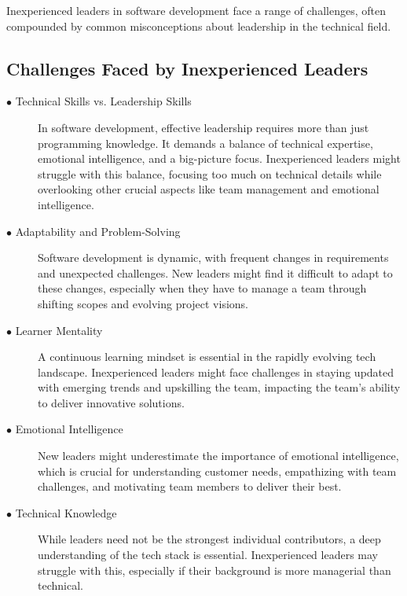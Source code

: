 \documentclass[runningheads]{llncs}
\begin{document}
 Inexperienced leaders in software development face a range of challenges, often compounded by common misconceptions about leadership in the technical field.

\subsection{Challenges Faced by Inexperienced Leaders}

\begin{description}
  \item [$\bullet$ Technical Skills vs. Leadership Skills] In software development, effective leadership requires more than just programming knowledge. It demands a balance of technical expertise, emotional intelligence, and a big-picture focus. Inexperienced leaders might struggle with this balance, focusing too much on technical details while overlooking other crucial aspects like team management and emotional intelligence.
  \\
  
  \item [$\bullet$ Adaptability and Problem-Solving] Software development is dynamic, with frequent changes in requirements and unexpected challenges. New leaders might find it difficult to adapt to these changes, especially when they have to manage a team through shifting scopes and evolving project visions.
  \\

  \item [$\bullet$ Learner Mentality] A continuous learning mindset is essential in the rapidly evolving tech landscape. Inexperienced leaders might face challenges in staying updated with emerging trends and upskilling the team, impacting the team's ability to deliver innovative solutions.
  \\
  
  \item [$\bullet$ Emotional Intelligence] New leaders might underestimate the importance of emotional intelligence, which is crucial for understanding customer needs, empathizing with team challenges, and motivating team members to deliver their best.
  \\
  
  \item [$\bullet$ Technical Knowledge] While leaders need not be the strongest individual contributors, a deep understanding of the tech stack is essential. Inexperienced leaders may struggle with this, especially if their background is more managerial than technical.
  \\
  
\end{description}
\end{document}
